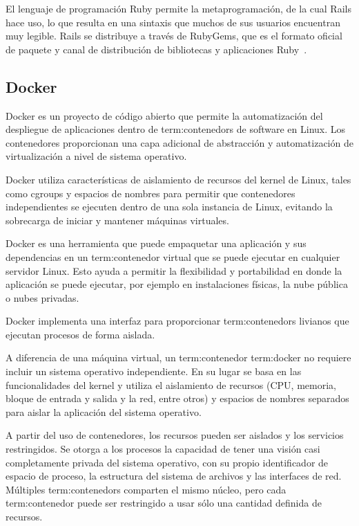 El lenguaje de programación Ruby permite la metaprogramación, de la cual Rails
hace uso, lo que resulta en una sintaxis que muchos de sus usuarios encuentran
muy legible. Rails se distribuye a través de RubyGems, que es el formato
oficial de paquete y canal de distribución de bibliotecas y aplicaciones
Ruby~\cite{ror}.

\subsection{Docker}

Docker es un proyecto de código abierto que permite la automatización del
despliegue de aplicaciones dentro de \glspl{term:contenedor} de software en Linux. Los
contenedores proporcionan una capa adicional de abstracción y automatización de
virtualización a nivel de sistema operativo.

Docker utiliza características de aislamiento de recursos del kernel de Linux,
tales como cgroups y espacios de nombres para permitir que contenedores
independientes se ejecuten dentro de una sola instancia de Linux, evitando la
sobrecarga de iniciar y mantener máquinas virtuales.

Docker es una herramienta que puede empaquetar una aplicación y sus
dependencias en un \gls{term:contenedor} virtual que se puede ejecutar en cualquier
servidor Linux. Esto ayuda a permitir la flexibilidad y portabilidad en donde
la aplicación se puede ejecutar, por ejemplo en instalaciones físicas, la nube
pública o nubes privadas.

Docker implementa una interfaz para proporcionar \glspl{term:contenedor} livianos que
ejecutan procesos de forma aislada.

A diferencia de una máquina virtual, un \gls{term:contenedor} \gls{term:docker} no requiere incluir
un sistema operativo independiente. En su lugar se basa en las funcionalidades
del kernel y utiliza el aislamiento de recursos (CPU, memoria, bloque de
entrada y salida y la red, entre otros) y espacios de nombres separados para
aislar la aplicación del sistema operativo.

A partir del uso de contenedores, los recursos pueden ser aislados y los
servicios restringidos. Se otorga a los procesos la capacidad de tener una
visión casi completamente privada del sistema operativo, con su propio
identificador de espacio de proceso, la estructura del sistema de archivos y
las interfaces de red. Múltiples \glspl{term:contenedor} comparten el mismo núcleo, pero
cada \gls{term:contenedor} puede ser restringido a usar sólo una cantidad definida de
recursos.

